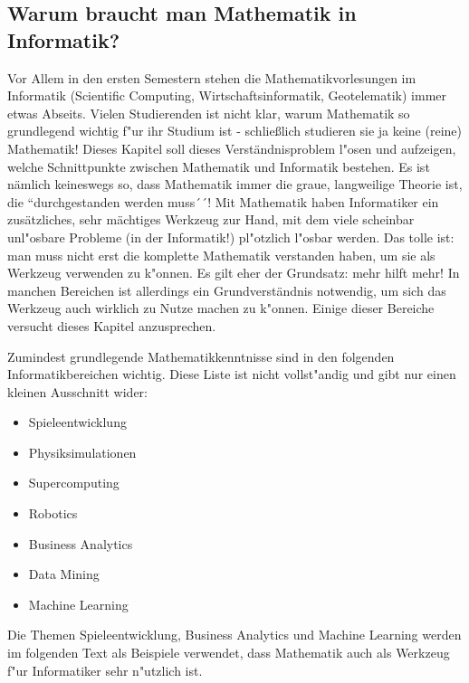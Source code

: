 \subsection{Warum braucht man Mathematik in Informatik?}

Vor Allem in den ersten Semestern stehen die Mathematikvorlesungen im Informatik (Scientific Computing, Wirtschaftsinformatik, Geotelematik) immer etwas Abseits. Vielen Studierenden ist nicht klar, warum Mathematik so grundlegend wichtig f"ur ihr Studium ist - schlie\ss lich studieren sie ja keine (reine) Mathematik! Dieses Kapitel soll dieses Verständnisproblem l"osen und aufzeigen, welche Schnittpunkte zwischen Mathematik und Informatik bestehen. Es ist nämlich keineswegs so, dass Mathematik immer die graue, langweilige Theorie ist, die ``durchgestanden werden muss´´! Mit Mathematik haben Informatiker ein zusätzliches, sehr mächtiges Werkzeug zur Hand, mit dem viele scheinbar unl"osbare Probleme (in der Informatik!) pl"otzlich l"osbar werden. Das tolle ist: man muss nicht erst die komplette Mathematik verstanden haben, um sie als Werkzeug verwenden zu k"onnen. Es gilt eher der Grundsatz: mehr hilft mehr! In manchen Bereichen ist allerdings ein Grundverständnis notwendig, um sich das Werkzeug auch wirklich zu Nutze machen zu k"onnen. Einige dieser Bereiche versucht dieses Kapitel anzusprechen.

Zumindest grundlegende Mathematikkenntnisse sind in den folgenden Informatikbereichen wichtig. Diese Liste ist nicht vollst"andig und gibt nur einen kleinen Ausschnitt wider:

\begin{itemize}
\item Spieleentwicklung
\item Physiksimulationen
\item  Supercomputing
\item Robotics
\item Business Analytics
\item Data Mining
\item Machine Learning
\end{itemize}
 

Die Themen Spieleentwicklung, Business Analytics und Machine Learning werden im folgenden Text als Beispiele verwendet, dass Mathematik auch als Werkzeug f"ur Informatiker sehr n"utzlich ist.

